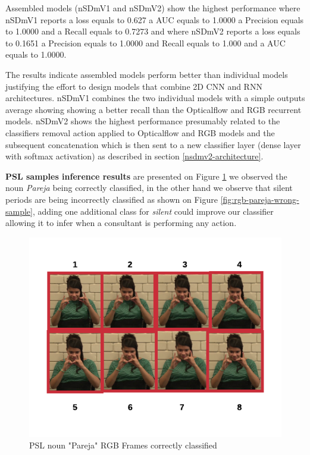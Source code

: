 \documentclass[twocolumn,conference]{article}
\begin{document}
Assembled models (nSDmV1 and nSDmV2) show the highest performance where nSDmV1 reports a loss equals to 0.627 a AUC equals to 1.0000 a Precision equals to 1.0000 and a Recall equals to 0.7273 and where nSDmV2 reports a loss equals to 0.1651 a Precision equals to 1.0000 and Recall equals to 1.000 and a AUC equals to 1.0000.

The results indicate assembled models perform better than individual models justifying the effort to design models that combine 2D CNN and RNN architectures. nSDmV1 combines the two individual models with a simple outputs average showing showing a better recall than the Opticalflow and RGB recurrent models. nSDmV2 shows the highest performance presumably related to the classifiers removal action applied to Opticalflow and RGB models and the subsequent concatenation which is then sent to a new classifier layer (dense layer with softmax activation) as described in section \ref{nsdmv2-architecture}.

\textbf{PSL samples inference results} are presented on Figure \ref{fig:rgb-pareja-sample} we observed the noun \textit{Pareja} being correctly classified, in the other hand we observe that silent periods are being incorrectly classified as shown on Figure \ref{fig:rgb-pareja-wrong-sample}, adding one additional class for \textit{silent} could improve our classifier allowing it to infer when a consultant is performing any action.

\begin{figure}[hbt!]
\includegraphics[width=\linewidth]{images/pareja-rgb-frames.png}
\caption{PSL noun "Pareja" RGB Frames correctly classified}
\label{fig:rgb-pareja-sample}
\end{figure}
\end{document}
